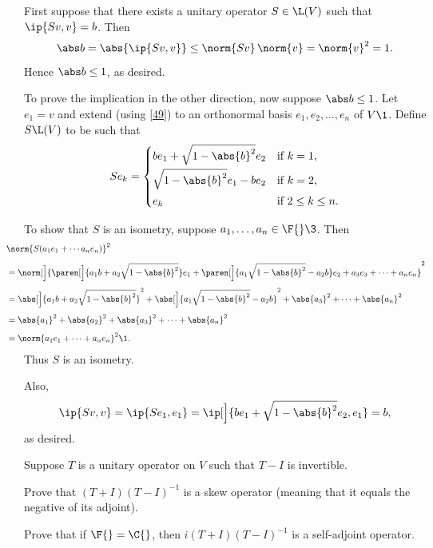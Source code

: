 \begin{Solution}
First suppose that there exists a unitary operator $S \in \L(V)$ such that $\ip{Sv, v} = b$. Then
\[
\abs b =\abs{ \ip{Sv, v} } \le \norm{Sv} \, \norm{v} = \norm{v}^2 = 1.
\]
Hence $\abs b \le 1$, as desired.

To prove the implication in the other direction, now suppose $\abs b \le 1$. Let $e_1 = v$ and extend (using \ref{49}) to an orthonormal basis $e_1, e_2, \ldots, e_n$ of $V\1$. Define $S \L(V)$ to be such that
\[
Se_k = \begin{cases}
be_1 + \sqrt{1 - \abs{b}^2} e_2 & \text{if } k = 1, \\[4bp]
\sqrt{1 - \abs{b}^2} e_1 - b e_2 & \text{if } k = 2, \\[4bp]
e_k & \text{if } 2 \le k \le n.
\end{cases}
\]

To show that $S$ is an isometry, suppose $a_1, \ldots, a_n \in \F{}\3$. Then
\begin{align*}
&\hspace*{-.3in}\norm{ S(a_1 e_1 + \cdots a_n e_n) }^2 \\[4bp]
&\hspace*{-.3in}= \norm[\Big]{ \paren[\Big]{a_1b + a_2 \sqrt{1 - \abs{b}^2}} e_1 + \paren[\Big]{a_1 \sqrt{ 1 - \abs{b}^2} - a_2 b} e_2 + a_3 e_3 + \cdots + a_n e_n }^2 \\[4bp]
&\hspace*{-.3in}= \abs[\Big]{a_1b + a_2 \sqrt{1 - \abs{b}^2}}^2 + \abs[\Big]{a_1 \sqrt{ 1 - \abs{b}^2} - a_2 b}^2 + \abs{a_3}^2 + \cdots + \abs{a_n}^2 \\[4bp]
&\hspace*{-.3in}= \abs{a_1}^2 + \abs{a_2}^2 + \abs{a_3}^2 + \cdots + \abs{a_n}^2 \\[4bp]
&\hspace*{-.3in}= \norm{a_1 e_1 + \cdots + a_n e_n}^2\1.
\end{align*}
Thus $S$ is an isometry.

Also,
\[
\ip{Sv, v} = \ip{ Se_1, e_1} = \ip[\Big]{ be_1 + \sqrt{1 - \abs{b}^2} e_2, e_1} = b,
\]
as desired.
\end{Solution}

\exercise
Suppose $T$ is a unitary operator on $V$ such that $T - I$ is invertible. \label{4UnitCircle}
\begin{subtheorem}
\item
Prove that $(T + I)(T - I)^{-1}$ is a skew operator (meaning that it equals the negative of its adjoint).
\item
Prove that if $\F{} = \C{}$, then $i (T + I)(T - I)^{-1}$ is a self-adjoint operator.
\end{subtheorem}

